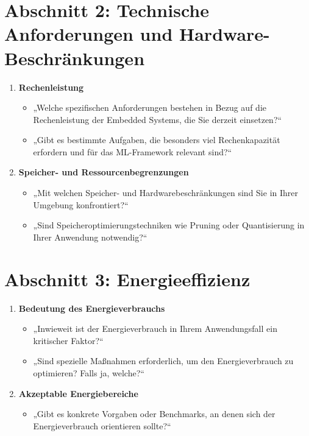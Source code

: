 \section*{Abschnitt 2: Technische Anforderungen und Hardware-Beschränkungen}
\begin{enumerate}
    \item \textbf{Rechenleistung}
    \begin{itemize}
        \item „Welche spezifischen Anforderungen bestehen in Bezug auf die Rechenleistung der Embedded Systems, die Sie derzeit einsetzen?“
        \item „Gibt es bestimmte Aufgaben, die besonders viel Rechenkapazität erfordern und für das ML-Framework relevant sind?“
    \end{itemize}
    \item \textbf{Speicher- und Ressourcenbegrenzungen}
    \begin{itemize}
        \item „Mit welchen Speicher- und Hardwarebeschränkungen sind Sie in Ihrer Umgebung konfrontiert?“
        \item „Sind Speicheroptimierungstechniken wie Pruning oder Quantisierung in Ihrer Anwendung notwendig?“
    \end{itemize}
\end{enumerate}

\section*{Abschnitt 3: Energieeffizienz}
\begin{enumerate}
    \item \textbf{Bedeutung des Energieverbrauchs}
    \begin{itemize}
        \item „Inwieweit ist der Energieverbrauch in Ihrem Anwendungsfall ein kritischer Faktor?“
        \item „Sind spezielle Maßnahmen erforderlich, um den Energieverbrauch zu optimieren? Falls ja, welche?“
    \end{itemize}
    \item \textbf{Akzeptable Energiebereiche}
    \begin{itemize}
        \item „Gibt es konkrete Vorgaben oder Benchmarks, an denen sich der Energieverbrauch orientieren sollte?“
    \end{itemize}
\end{enumerate}

